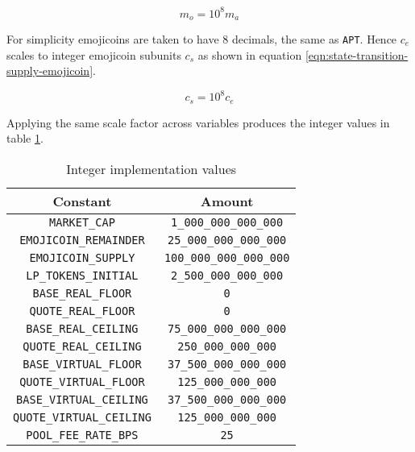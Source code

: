 \documentclass[table, twocolumn]{article}
\begin{document}
\begin{equation} \label{eqn:state-transition-market-cap-apt}
  m_o = 10^8 m_a
\end{equation}

For simplicity emojicoins are taken to have 8 decimals, the same as \texttt{APT}. Hence
$c_e$ scales to integer emojicoin subunits $c_s$ as shown in equation
\ref{eqn:state-transition-supply-emojicoin}.

\begin{equation} \label{eqn:state-transition-supply-emojicoin}
  c_s = 10^8 c_e
\end{equation}

Applying the same scale factor across variables produces the integer values in table
\ref{tab:integer-implementation-values}.

\begin{table}[!htb]
  \centering
  \begin{tabular}{|c|c|}
    \hline \rowcolor{blue}
    Constant                         & Amount                           \\ \hline
    \texttt{MARKET\_CAP}             & \texttt{1\_000\_000\_000\_000}   \\ \hline
    \texttt{EMOJICOIN\_REMAINDER}    & \texttt{25\_000\_000\_000\_000}  \\ \hline
    \texttt{EMOJICOIN\_SUPPLY}       & \texttt{100\_000\_000\_000\_000} \\ \hline
    \texttt{LP\_TOKENS\_INITIAL}     & \texttt{2\_500\_000\_000\_000}   \\ \hline
    \texttt{BASE\_REAL\_FLOOR}       & \texttt{0}                       \\ \hline
    \texttt{QUOTE\_REAL\_FLOOR}      & \texttt{0}                       \\ \hline
    \texttt{BASE\_REAL\_CEILING}     & \texttt{75\_000\_000\_000\_000}  \\ \hline
    \texttt{QUOTE\_REAL\_CEILING}    & \texttt{250\_000\_000\_000}      \\ \hline
    \texttt{BASE\_VIRTUAL\_FLOOR}    & \texttt{37\_500\_000\_000\_000}  \\ \hline
    \texttt{QUOTE\_VIRTUAL\_FLOOR}   & \texttt{125\_000\_000\_000}      \\ \hline
    \texttt{BASE\_VIRTUAL\_CEILING}  & \texttt{37\_500\_000\_000\_000}  \\ \hline
    \texttt{QUOTE\_VIRTUAL\_CEILING} & \texttt{125\_000\_000\_000}      \\ \hline
    \texttt{POOL\_FEE\_RATE\_BPS}    & \texttt{25}                      \\ \hline
  \end{tabular}
  \caption{Integer implementation values}
  \label{tab:integer-implementation-values}
\end{table}
\end{document}
